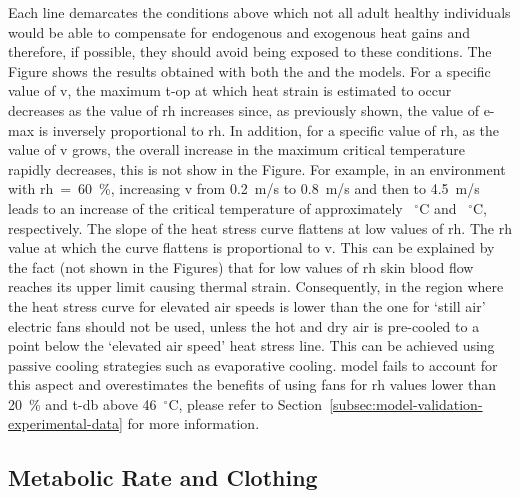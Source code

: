 Each line demarcates the conditions above which not all adult healthy individuals would be able to compensate for endogenous and exogenous heat gains and therefore, if possible, they should avoid being exposed to these conditions.
The Figure shows the results obtained with both the  and the  models.
For a specific value of \ac{v}, the maximum \ac{t-op} at which heat strain is estimated to occur decreases as the value of \ac{rh} increases since, as previously shown, the value of \ac{e-max} is inversely proportional to \ac{rh}.
In addition, for a specific value of \ac{rh}, as the value of \ac{v} grows, the overall increase in the maximum critical temperature rapidly decreases, this is not show in the Figure.
For example, in an environment with \ac{rh}~=~60~\%, increasing \ac{v} from 0.2~m/s to 0.8~m/s and then to 4.5~m/s leads to an increase of the critical temperature of approximately ~$^{\circ}$C and ~$^{\circ}$C, respectively.
The slope of the heat stress curve flattens at low values of \ac{rh}.
The \ac{rh} value at which the curve flattens is proportional to \ac{v}.
This can be explained by the fact (not shown in the Figures) that for low values of \ac{rh} skin blood flow reaches its upper limit causing thermal strain.
Consequently, in the region where the heat stress curve for elevated air speeds is lower than the one for `still air' electric fans should not be used, unless the hot and dry air is pre-cooled to a point below the `elevated air speed' heat stress line.
This can be achieved using passive cooling strategies such as evaporative cooling.
 model fails to account for this aspect and overestimates the benefits of using fans for \ac{rh} values lower than 20~\% and \ac{t-db} above 46~$^{\circ}$C, please refer to Section~\ref{subsec:model-validation-experimental-data} for more information.


\subsection{Metabolic Rate and Clothing}\label{subsec:met-clo}

